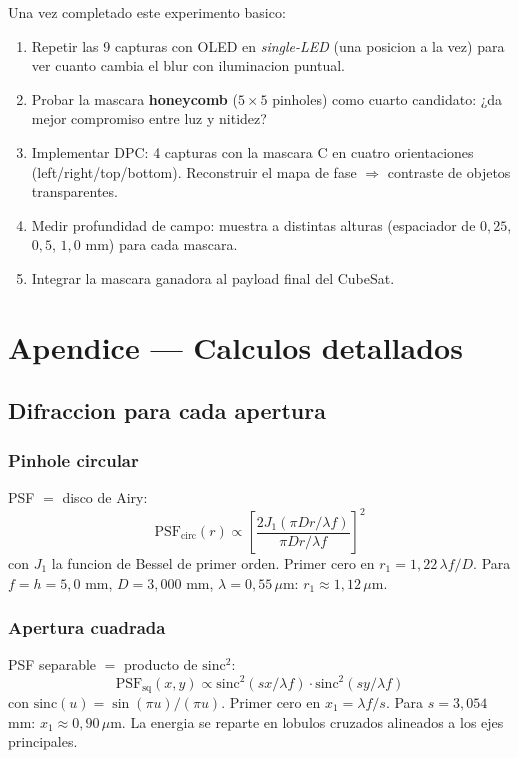 \documentclass[11pt,a4paper,oneside]{report}
\begin{document}
\begin{accion}
Una vez completado este experimento basico:

\begin{enumerate}[leftmargin=2.2em]
  \item Repetir las 9 capturas con OLED en \emph{single-LED} (una posicion a la vez)
        para ver cuanto cambia el blur con iluminacion puntual.
  \item Probar la mascara \textbf{honeycomb} ($5\times 5$ pinholes) como cuarto candidato:
        ¿da mejor compromiso entre luz y nitidez?
  \item Implementar DPC: 4 capturas con la mascara C en cuatro orientaciones
        (left/right/top/bottom). Reconstruir el mapa de fase $\Rightarrow$
        contraste de objetos transparentes.
  \item Medir profundidad de campo: muestra a distintas alturas (espaciador
        de $0{,}25$, $0{,}5$, $1{,}0$ mm) para cada mascara.
  \item Integrar la mascara ganadora al payload final del CubeSat.
\end{enumerate}
\end{accion}

\appendix
\chapter{Apendice --- Calculos detallados}

\section{Difraccion para cada apertura}

\subsection{Pinhole circular}
PSF $=$ disco de Airy:
\[
\mathrm{PSF}_{\text{circ}}(r) \propto \left[\frac{2 J_1(\pi D r / \lambda f)}{\pi D r / \lambda f}\right]^2
\]
con $J_1$ la funcion de Bessel de primer orden. Primer cero en $r_1 = 1{,}22\,\lambda f / D$.
Para $f = h = 5{,}0$ mm, $D = 3{,}000$ mm, $\lambda = 0{,}55\,\mu$m:
$r_1 \approx 1{,}12\,\mu$m.

\subsection{Apertura cuadrada}
PSF separable $=$ producto de $\mathrm{sinc}^2$:
\[
\mathrm{PSF}_{\text{sq}}(x,y) \propto \mathrm{sinc}^2(s x / \lambda f) \cdot \mathrm{sinc}^2(s y / \lambda f)
\]
con $\mathrm{sinc}(u) = \sin(\pi u)/(\pi u)$. Primer cero en $x_1 = \lambda f / s$.
Para $s = 3{,}054$ mm: $x_1 \approx 0{,}90\,\mu$m. La energia se reparte en lobulos cruzados
alineados a los ejes principales.
\end{document}
